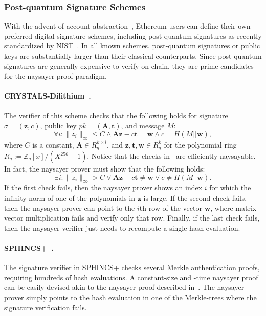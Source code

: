 \subsubsection{Post-quantum Signature Schemes}\label{sec:pqsig_naysayer}
With the advent of account abstraction~\cite{accountabstraction}, Ethereum users can define their own preferred digital signature schemes, including post-quantum signatures as recently standardized by NIST~\cite{CCS:BHKNRS19,TCHES:DKLLS18,NISTPQC:FALCON22}.
In all known schemes, %
post-quantum signatures or public keys are substantially larger than their classical counterparts.  Since post-quantum signatures are generally expensive to verify on-chain, they are prime candidates for the naysayer proof paradigm.

\paragraph{CRYSTALS-Dilithium~\cite{TCHES:DKLLS18}.} The verifier of this scheme checks that the following holds for signature $\sigma=(\mathbf{z},c)$, public key $\mathit{pk}=(\mathbf{A},\mathbf{t})$, and message $M$:
\begin{equation}\label{eq:crystals_verifier_check}
    \forall i: \lVert z_i\rVert_{\infty}\leq C\land \mathbf{A}\mathbf{z}-c\mathbf{t} = \mathbf{w} \land c=H(M\vert\vert \mathbf{w}),
\end{equation}
where $C$ is a constant, $\mathbf{A}\in R^{k\times l}_q$, and $\mathbf{z},\mathbf{t},\mathbf{w}\in R^{k}_q$ for the polynomial ring $R_q:=\mathbb{Z}_q[x]/(X^{256}+1)$. Notice that the checks in~ are efficiently naysayable. In fact, the naysayer prover must show that the following holds: 
\begin{equation}\label{eq:crystals_naysayer_prover}
    \exists i: \lVert z_i\rVert_{\infty}>C\lor \mathbf{A}\mathbf{z}-c\mathbf{t} \neq \mathbf{w} \lor c\neq H(M\vert\vert \mathbf{w}).
\end{equation}
If the first check fails, then the naysayer prover shows an index $i$ for which the infinity norm of one of the polynomials in $\mathbf{z}$ is large. If the second check fails, then the naysayer prover can point to the $i$th row of the vector $\mathbf{w}$, where matrix-vector multiplication fails and verify only that row. Finally, if the last check fails, then the naysayer verifier just needs to recompute a single hash evaluation.

\paragraph{SPHINCS+~\cite{CCS:BHKNRS19}.} The signature verifier in SPHINCS+ checks several Merkle authentication proofs, requiring hundreds of hash evaluations. A constant-size and -time naysayer proof can be easily devised akin to the naysayer proof described in~. The naysayer prover simply points to the hash evaluation in one of the Merkle-trees where the signature verification fails. 

